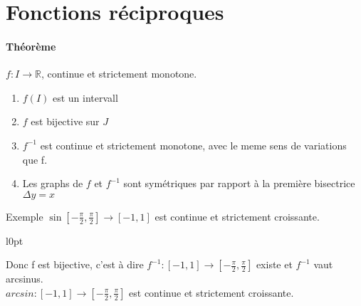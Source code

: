 \section{Fonctions réciproques}

\paragraph{Théorème} $f : I \rightarrow \mathbb{R}$, continue et strictement monotone.
\begin{enumerate}
	\item $f(I)$ est un intervall
	\item $f$ est bijective sur $J$
	\item $f^{-1}$  est continue et strictement monotone, avec le meme sens de variations que f.
	\item Les graphs de $f$ et $f^{-1}$ sont symétriques par rapport à la première bisectrice $\Delta y=x$
\end{enumerate}

Exemple $\sin [-\frac{\pi}{2}, \frac{\pi}{2}] \rightarrow [-1, 1]$ est continue et strictement croissante.

\begin{wrapfigure}[3]{l}{0pt}
\end{wrapfigure}
Donc f est bijective, c'est à dire $f^{-1} : [-1, 1] \rightarrow [-\frac{\pi}{2}, \frac{\pi}{2}]$ existe et $f^{-1}$ vaut arcsinus. ~\\
$arcsin : [-1, 1] \rightarrow [-\frac{\pi}{2}, \frac{\pi}{2}]$ est continue et strictement croissante.

~\\
~\\
~\\
~\\

